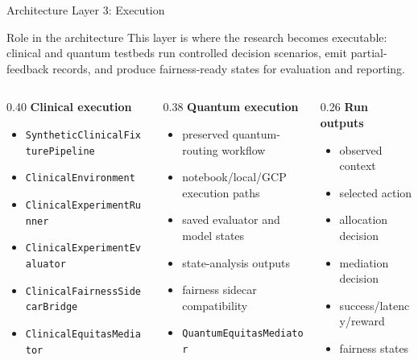 \documentclass[aspectratio=169,10pt]{beamer}
\begin{document}
\begin{frame}{Architecture Layer 3: Execution}
\small
\vspace{-0.3cm}
\begin{block}{Role in the architecture}
This layer is where the research becomes executable: clinical and quantum testbeds run controlled decision scenarios, emit partial-feedback records, and produce fairness-ready states for evaluation and reporting.
\end{block}

\vspace{-0.3cm}

\begin{columns}[T]
\begin{column}{0.40\textwidth}
\textbf{\textcolor{phase3orange}{Clinical execution}}
\vspace{-0.1cm}
\begin{itemize}
    \item \texttt{SyntheticClinicalFixturePipeline}
    \item \texttt{ClinicalEnvironment}
    \item \texttt{ClinicalExperimentRunner}
    \item \texttt{ClinicalExperimentEvaluator}
    \item \texttt{ClinicalFairnessSidecarBridge}
    \item \texttt{ClinicalEquitasMediator}
\end{itemize}
\end{column}

\begin{column}{0.38\textwidth}
\textbf{\textcolor{phase3orange}{Quantum execution}}
\vspace{-0.1cm}
\begin{itemize}
    \item preserved quantum-routing workflow
    \item notebook/local/GCP execution paths
    \item saved evaluator and model states
    \item state-analysis outputs
    \item fairness sidecar compatibility
    \item \texttt{QuantumEquitasMediator}
\end{itemize}
\end{column}

\begin{column}{0.26\textwidth}
\textbf{\textcolor{phase3orange}{Run outputs}}
\vspace{-0.1cm}
\begin{itemize}
    \item observed context
    \item selected action
    \item allocation decision
    \item mediation decision
    \item success/latency/reward
    \item fairness states
\end{itemize}
\end{column}
\end{columns}


\end{frame}
\end{document}
